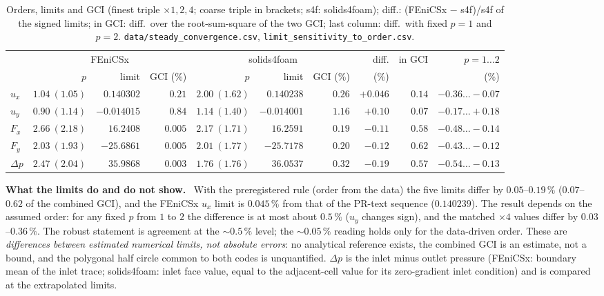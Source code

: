 \documentclass[sn-mathphys,Numbered]{sn-jnl}
\renewcommand{\paragraph}[1]{\par\vspace{0.3\baselineskip}\noindent\textbf{#1}\ }
\newcommand{\FE}{FEniCSx}
\begin{document}
\begin{table}[!ht]
\centering
\caption{Orders, limits and GCI (finest triple $\times1,2,4$; coarse triple in brackets; s4f: solids4foam); diff.: (\FE{} $-$ s4f)/s4f of the signed limits; in GCI: diff.\ over the root-sum-square of the two GCI; last column: diff.\ with fixed $p=1$ and $p=2$. \texttt{data/steady\_convergence.csv}, \texttt{limit\_sensitivity\_to\_order.csv}.}\label{tab:nh_limits}
\footnotesize
\setlength{\tabcolsep}{3pt}
\begin{tabular}{@{}lrrrrrrrrr@{}}
\toprule
 & \multicolumn{3}{c}{\FE{}} & \multicolumn{3}{c}{solids4foam} & diff. & in GCI & $p=1\ldots2$ \\
\cmidrule(r){2-4}\cmidrule(lr){5-7}
 & $p$ & limit & GCI (\%) & $p$ & limit & GCI (\%) & (\%) & & (\%) \\
\midrule
$u_x$ & $1.04\ (1.05)$ & $0.140302$ & $0.21$ & $2.00\ (1.62)$ & $0.140238$ & $0.26$ & $+0.046$ & $0.14$ & $-0.36\ldots-0.07$ \\
$u_y$ & $0.90\ (1.14)$ & $-0.014015$ & $0.84$ & $1.14\ (1.40)$ & $-0.014001$ & $1.16$ & $+0.10$ & $0.07$ & $-0.17\ldots+0.18$ \\
$F_x$ & $2.66\ (2.18)$ & $16.2408$ & $0.005$ & $2.17\ (1.71)$ & $16.2591$ & $0.19$ & $-0.11$ & $0.58$ & $-0.48\ldots-0.14$ \\
$F_y$ & $2.03\ (1.93)$ & $-25.6861$ & $0.005$ & $2.01\ (1.77)$ & $-25.7178$ & $0.20$ & $-0.12$ & $0.62$ & $-0.43\ldots-0.12$ \\
$\Delta p$ & $2.47\ (2.04)$ & $35.9868$ & $0.003$ & $1.76\ (1.76)$ & $36.0537$ & $0.32$ & $-0.19$ & $0.57$ & $-0.54\ldots-0.13$ \\
\bottomrule
\end{tabular}
\end{table}

\paragraph{What the limits do and do not show.}
With the preregistered rule (order from the data) the five limits differ by $0.05$--$0.19\,\%$ ($0.07$--$0.62$ of the combined GCI), and the \FE{} $u_x$ limit is $0.045\,\%$ from that of the PR-text sequence ($0.140239$). The result depends on the assumed order: for any fixed $p$ from $1$ to $2$ the difference is at most about $0.5\,\%$ ($u_y$ changes sign), and the matched $\times4$ values differ by $0.03$--$0.36\,\%$. The robust statement is agreement at the $\sim0.5\,\%$ level; the $\sim0.05\,\%$ reading holds only for the data-driven order. These are \emph{differences between estimated numerical limits, not absolute errors}: no analytical reference exists, the combined GCI is an estimate, not a bound, and the polygonal half circle common to both codes is unquantified. $\Delta p$ is the inlet minus outlet pressure (\FE{}: boundary mean of the inlet trace; solids4foam: inlet face value, equal to the adjacent-cell value for its zero-gradient inlet condition) and is compared at the extrapolated limits.
\end{document}
